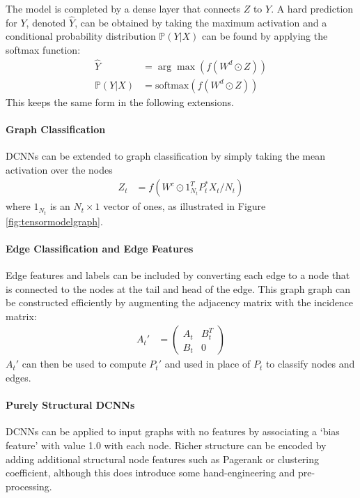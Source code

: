 \documentclass{article}
\begin{document}
The model is completed by a dense layer that connects $Z$ to $Y$.  A hard prediction for $Y$, denoted $\hat{Y}$, can be obtained by taking the maximum activation and a conditional probability distribution $\mathbb{P}(Y|X)$ can be found by applying the softmax function:
\begin{align}
    \hat{Y} &= \arg \max \left(f\left(W^d \odot Z\right)\right) \\
    \mathbb{P}(Y|X)  &= \text{softmax}\left(f\left(W^d \odot Z\right)\right)
    \label{eqn:top}
\end{align}
This keeps the same form in the following extensions.

\paragraph{Graph Classification}
DCNNs can be extended to graph classification by simply taking the mean activation over the nodes
\begin{align}
Z_t &= f\left(W^c \odot 1_{N_t}^T P_t^* X_t / N_t\right)
\label{eqn:graphactivations}
\end{align}
where $1_{N_t}$ is an $N_t \times 1$ vector of ones, as illustrated in Figure \ref{fig:tensormodelgraph}.

\paragraph{Edge Classification and Edge Features}
Edge features and labels can be included by converting each edge to a node that is connected to the nodes at the tail and head of the edge.  This graph graph can be constructed efficiently by augmenting the adjacency matrix with the incidence matrix:
\begin{align}
    A_t' &= \left( \begin{array}{cc}
    A_t & B_t^T \\
    B_t & 0 \end{array} \right)
\end{align}
$A_t'$  can then be used to compute $P_t'$ and used in place of $P_t$ to classify nodes and edges.

\paragraph{Purely Structural DCNNs}
DCNNs can be applied to input graphs with no features by associating a `bias feature' with value 1.0 with each node.  Richer structure can be encoded by adding additional structural node features such as Pagerank or  clustering coefficient, although this does introduce some hand-engineering and pre-processing.
\end{document}
